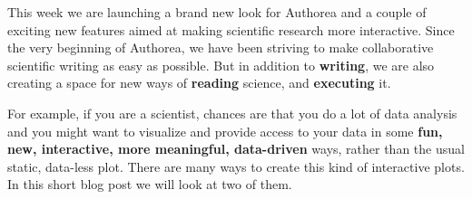 This week we are launching a brand new look for Authorea and a couple of exciting new features aimed at making scientific research more interactive. Since the very beginning of Authorea, we have been striving to make collaborative scientific writing as easy as possible. But in addition to \textbf{writing}, we are also creating a space for new ways of \textbf{reading} science, and \textbf{executing} it.

For example, if you are a scientist, chances are that you do a lot of data analysis and you might want to visualize and provide access to your data in some \textbf{fun, new, interactive, more meaningful, data-driven} ways, rather than the usual static, data-less plot. There are many ways to create this kind of interactive plots. In this short blog post we will look at two of them. 